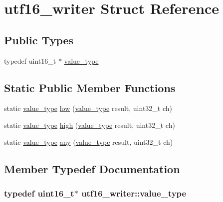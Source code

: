 \hypertarget{structutf16__writer}{\section{utf16\-\_\-writer Struct Reference}
\label{structutf16__writer}
}
\subsection*{Public Types}
\begin{DoxyCompactItemize}
\item 
typedef uint16\-\_\-t $\ast$ \hyperlink{structutf16__writer_a527b705eaf5099167b8bc42423ce918c}{value\-\_\-type}
\end{DoxyCompactItemize}
\subsection*{Static Public Member Functions}
\begin{DoxyCompactItemize}
\item 
static \hyperlink{structutf16__writer_a527b705eaf5099167b8bc42423ce918c}{value\-\_\-type} \hyperlink{structutf16__writer_ab11fef721a8b38de5e315d2e75d12956}{low} (\hyperlink{structutf16__writer_a527b705eaf5099167b8bc42423ce918c}{value\-\_\-type} result, uint32\-\_\-t ch)
\item 
static \hyperlink{structutf16__writer_a527b705eaf5099167b8bc42423ce918c}{value\-\_\-type} \hyperlink{structutf16__writer_a01b6ce1a567dea11daead3ca83f42d5c}{high} (\hyperlink{structutf16__writer_a527b705eaf5099167b8bc42423ce918c}{value\-\_\-type} result, uint32\-\_\-t ch)
\item 
static \hyperlink{structutf16__writer_a527b705eaf5099167b8bc42423ce918c}{value\-\_\-type} \hyperlink{structutf16__writer_ac14e06db126fbbef4be7efdb80fbdf4a}{any} (\hyperlink{structutf16__writer_a527b705eaf5099167b8bc42423ce918c}{value\-\_\-type} result, uint32\-\_\-t ch)
\end{DoxyCompactItemize}


\subsection{Member Typedef Documentation}
\hypertarget{structutf16__writer_a527b705eaf5099167b8bc42423ce918c}{
\subsubsection[{value\-\_\-type}]{\setlength{\rightskip}{0pt plus 5cm}typedef uint16\-\_\-t$\ast$ {\bf utf16\-\_\-writer\-::value\-\_\-type}}}\label{structutf16__writer_a527b705eaf5099167b8bc42423ce918c}


